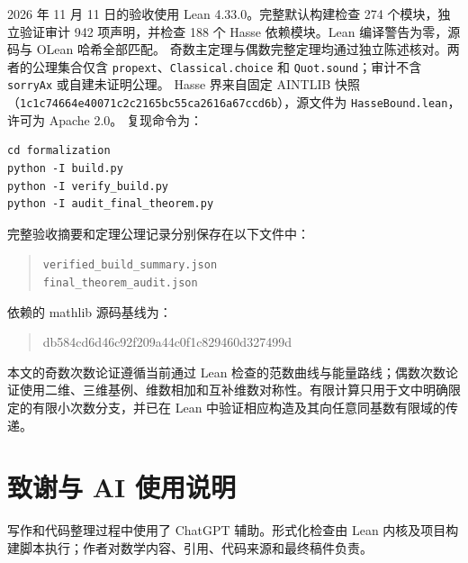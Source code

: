\documentclass[UTF8,a4paper,11pt]{ctexart}
\numberwithin{equation}{section}
\theoremstyle{definition}
\theoremstyle{remark}
\begin{document}
{\raggedright
2026 年 11 月 11 日的验收使用 Lean 4.33.0。完整默认构建检查 274 个模块，独立验证审计 942 项声明，并检查 188 个 Hasse 依赖模块。Lean 编译警告为零，源码与 OLean 哈希全部匹配。
奇数主定理与偶数完整定理均通过独立陈述核对。两者的公理集合仅含 \texttt{propext}、\texttt{Classical.choice} 和 \texttt{Quot.sound}；审计不含 \texttt{sorryAx} 或自建未证明公理。
Hasse 界来自固定 AINTLIB 快照\cite{AINTLIB}（\texttt{1c1c7466\allowbreak 4e40071c\allowbreak 2c2165bc\allowbreak 55ca2616\allowbreak a67ccd6b}），源文件为 \texttt{HasseBound.lean}，许可为 Apache 2.0。
复现命令为：
\par}
\begin{verbatim}
cd formalization
python -I build.py
python -I verify_build.py
python -I audit_final_theorem.py
\end{verbatim}
完整验收摘要和定理公理记录分别保存在以下文件中：\par
\begin{quote}\small\texttt{verified\_build\_summary.json}\\
\texttt{final\_theorem\_audit.json}\end{quote}
依赖的 mathlib 源码基线为：\par
\begin{quote}\small\ttfamily db584cd6d46c92f209a44c0f1c829460d327499d\end{quote}

本文的奇数次数论证遵循当前通过 Lean 检查的范数曲线与能量路线；偶数次数论证使用二维、三维基例、维数相加和互补维数对称性。有限计算只用于文中明确限定的有限小次数分支，并已在 Lean 中验证相应构造及其向任意同基数有限域的传递。


\section*{致谢与 AI 使用说明}
写作和代码整理过程中使用了 ChatGPT 辅助。形式化检查由 Lean 内核及项目构建脚本执行；作者对数学内容、引用、代码来源和最终稿件负责。
\end{document}
